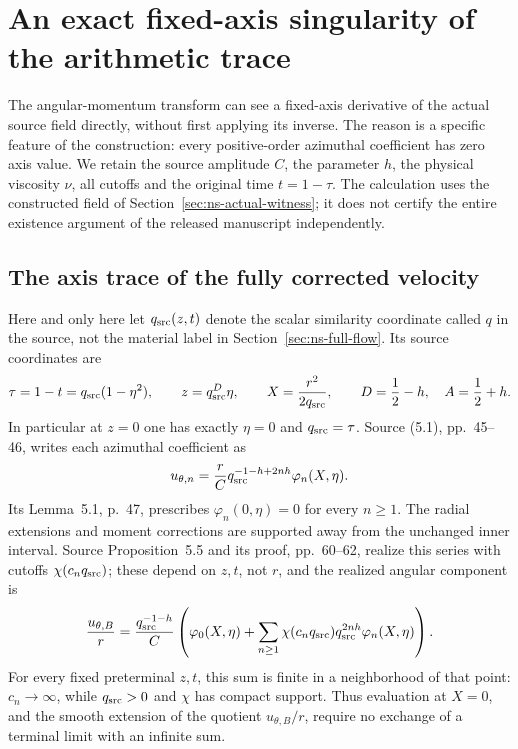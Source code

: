 \section{An exact fixed-axis singularity of the arithmetic trace}
\label{sec:ns-axis-arithmetic-jet}

The angular-momentum transform can see a fixed-axis derivative of the
actual source field directly, without first applying its inverse. The
reason is a specific feature of the construction: every positive-order
azimuthal coefficient has zero axis value. We retain the source amplitude
\(C\), the parameter \(h\), the physical viscosity \(\nu\), all cutoffs and
the original time \(t=1-\tau\). The calculation uses the constructed
field of Section~\ref{sec:ns-actual-witness}; it does not certify the
entire existence argument of the released manuscript independently.

\subsection{The axis trace of the fully corrected velocity}

Here and only here let \(q_{\rm src}(z,t)\) denote the scalar similarity
coordinate called \(q\) in the source, not the material label in
Section~\ref{sec:ns-full-flow}. Its source coordinates are
\[
 \tau=1-t=q_{\rm src}(1-\eta^2),\qquad
 z=q_{\rm src}^{D}\eta,\qquad
 X=\frac{r^2}{2q_{\rm src}},\qquad
 D=\frac12-h,\quad A=\frac12+h.
\]
In particular at \(z=0\) one has exactly \(\eta=0\) and
\(q_{\rm src}=\tau\).
Source (5.1), pp.~45--46, writes each azimuthal coefficient as
\[
 u_{\theta,n}
   =\frac rC q_{\rm src}^{-1-h+2nh}\varphi_n(X,\eta).
\]
Its Lemma~5.1, p.~47, prescribes
\(\varphi_n(0,\eta)=0\) for every \(n\ge1\).
The radial extensions and moment corrections are supported away from
the unchanged inner interval. Source Proposition~5.5 and its proof,
pp.~60--62, realize this series with cutoffs \(\chi(c_nq_{\rm src})\);
these depend on \(z,t\), not \(r\), and the realized angular component is
\begin{equation}\label{naj:base-series}
 \frac{u_{\theta,B}}r
 =\frac{q_{\rm src}^{-1-h}}C
 \left(\varphi_0(X,\eta)+
   \sum_{n\ge1}\chi(c_nq_{\rm src})
                       q_{\rm src}^{2nh}\varphi_n(X,\eta)\right).
\end{equation}
For every fixed preterminal \(z,t\), this sum is finite in a neighborhood
of that point: \(c_n\to\infty\), while \(q_{\rm src}>0\) and \(\chi\)
has compact support. Thus evaluation at \(X=0\), and the smooth extension
of the quotient \(u_{\theta,B}/r\), require no exchange of a terminal
limit with an infinite sum.

